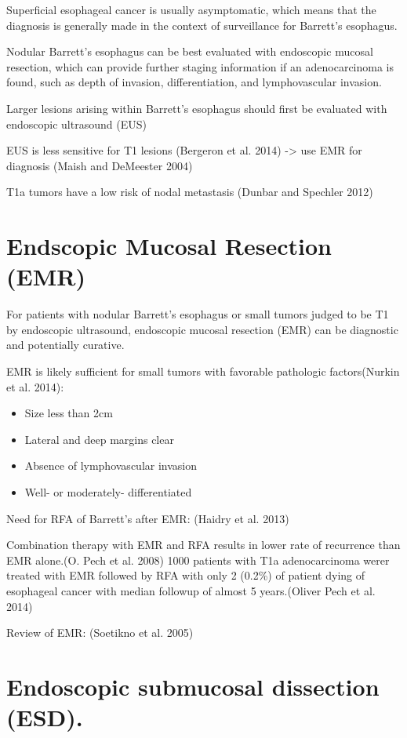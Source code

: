 \documentclass[
  letterpaper,
]{scrbook}
\providecommand{\tightlist}{%
  \setlength{\itemsep}{0pt}\setlength{\parskip}{0pt}}
\begin{document}
Superficial esophageal cancer is usually asymptomatic, which means that
the diagnosis is generally made in the context of surveillance for
Barrett's esophagus.

Nodular Barrett's esophagus can be best evaluated with endoscopic
mucosal resection, which can provide further staging information if an
adenocarcinoma is found, such as depth of invasion, differentiation, and
lymphovascular invasion.

Larger lesions arising within Barrett's esophagus should first be
evaluated with endoscopic ultrasound (EUS)

EUS is less sensitive for T1 lesions (Bergeron et al. 2014)
-\textgreater{} use EMR for diagnosis (Maish and DeMeester 2004)

T1a tumors have a low risk of nodal metastasis (Dunbar and Spechler
2012)

\section{Endscopic Mucosal Resection (EMR)}\label{emr}

For patients with nodular Barrett's esophagus or small tumors judged to
be T1 by endoscopic ultrasound, endoscopic mucosal resection (EMR) can
be diagnostic and potentially curative.

EMR is likely sufficient for small tumors with favorable pathologic
factors(Nurkin et al. 2014):

\begin{itemize}
\tightlist
\item
  Size less than 2cm
\item
  Lateral and deep margins clear
\item
  Absence of lymphovascular invasion
\item
  Well- or moderately- differentiated
\end{itemize}

Need for RFA of Barrett's after EMR: (Haidry et al. 2013)

Combination therapy with EMR and RFA results in lower rate of recurrence
than EMR alone.(O. Pech et al. 2008) 1000 patients with T1a
adenocarcinoma werer treated with EMR followed by RFA with only 2
(0.2\%) of patient dying of esophageal cancer with median followup of
almost 5 years.(Oliver Pech et al. 2014)

Review of EMR: (Soetikno et al. 2005)

\section{Endoscopic submucosal dissection (ESD).}\label{esd}
\end{document}
